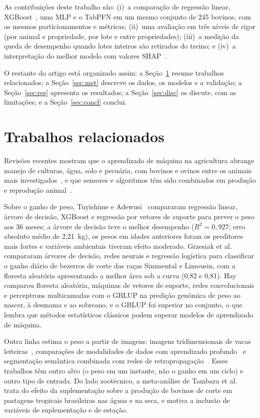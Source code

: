 \documentclass[conference]{IEEEtran}
\begin{document}
As contribuições deste trabalho são: (i)~a comparação de regressão linear, XGBoost~\cite{chen2016xgboost}, uma MLP e o TabPFN em um mesmo conjunto de 245 bovinos, com os mesmos particionamentos e métricas; (ii)~uma avaliação em três níveis de rigor (por animal e propriedade, por lote e entre propriedades); (iii)~a medição da queda de desempenho quando lotes inteiros são retirados do treino; e (iv)~a interpretação do melhor modelo com valores SHAP~\cite{lundberg2017shap}.

O restante do artigo está organizado assim: a Seção~\ref{sec:rel} resume trabalhos relacionados; a Seção~\ref{sec:met} descreve os dados, os modelos e a validação; a Seção~\ref{sec:res} apresenta os resultados; a Seção~\ref{sec:disc} os discute, com as limitações; e a Seção~\ref{sec:concl} conclui.

\section{Trabalhos relacionados}\label{sec:rel}

Revisões recentes mostram que o aprendizado de máquina na agricultura abrange manejo de culturas, água, solo e pecuária, com bovinos e ovinos entre os animais mais investigados~\cite{benos2021}, e que sensores e algoritmos têm sido combinados em produção e reprodução animal~\cite{curti2023}.

Sobre o ganho de peso, Tuyishime e Adewusi~\cite{tuyishime2025} compararam regressão linear, árvore de decisão, XGBoost e regressão por vetores de suporte para prever o peso aos 36 meses; a árvore de decisão teve o melhor desempenho ($R^2 = 0{,}927$; erro absoluto médio de 2,21~kg), os pesos em idades anteriores foram os preditores mais fortes e variáveis ambientais tiveram efeito moderado. Grzesiak et al.~\cite{grzesiak2023} compararam árvores de decisão, redes neurais e regressão logística para classificar o ganho diário de bezerros de corte das raças Simmental e Limousin, com a floresta aleatória apresentando a melhor área sob a curva (0,82 e 0,81). Hay~\cite{hay2024} comparou floresta aleatória, máquinas de vetores de suporte, redes convolucionais e perceptrons multicamadas com o GBLUP na predição genômica de peso ao nascer, à desmama e ao sobreano, e o GBLUP foi superior no conjunto, o que lembra que métodos estatísticos clássicos podem superar modelos de aprendizado de máquina.

Outra linha estima o peso a partir de imagens: imagens tridimensionais de vacas leiteiras~\cite{gebreyesus2023}, comparações de modalidades de dados com aprendizado profundo~\cite{afridi2024} e segmentação semântica combinada com redes de retropropagação~\cite{xu2024}. Esses trabalhos têm outro alvo (o peso em um instante, não o ganho em um ciclo) e outro tipo de entrada. Do lado zootécnico, a meta-análise de Tambara et al.~\cite{tambara2021} trata do efeito da suplementação sobre a produção de bovinos de corte em pastagens tropicais brasileiras nas águas e na seca, e motiva a inclusão de variáveis de suplementação e de estação.
\end{document}
